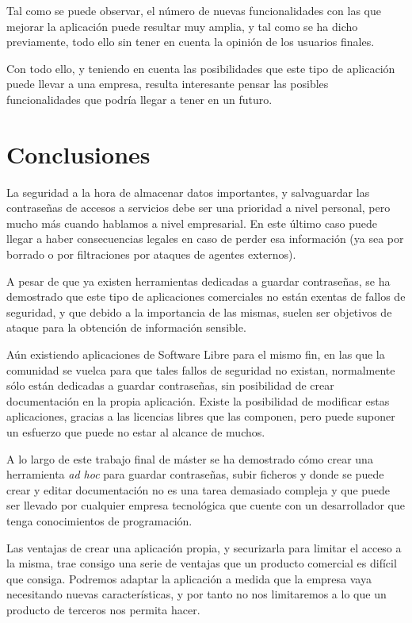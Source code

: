 \documentclass{\ClassPath/viu-tfm-template}
\begin{document}
Tal como se puede observar, el número de nuevas funcionalidades con las que mejorar la aplicación puede resultar muy amplia, y tal como se ha dicho previamente, todo ello sin tener en cuenta la opinión de los usuarios finales.

Con todo ello, y teniendo en cuenta las posibilidades que este tipo de aplicación puede llevar a una empresa, resulta interesante pensar las posibles funcionalidades que podría llegar a tener en un futuro.



\vfill
\pagebreak
\chapter{Conclusiones}

La seguridad a la hora de almacenar datos importantes, y salvaguardar las contraseñas de accesos a servicios debe ser una prioridad a nivel personal, pero mucho más cuando hablamos a nivel empresarial. En este último caso puede llegar a haber consecuencias legales en caso de perder esa información (ya sea por borrado o por filtraciones por ataques de agentes externos).

A pesar de que ya existen herramientas dedicadas a guardar contraseñas, se ha demostrado que este tipo de aplicaciones comerciales no están exentas de fallos de seguridad, y que debido a la importancia de las mismas, suelen ser objetivos de ataque para la obtención de información sensible.

Aún existiendo aplicaciones de Software Libre para el mismo fin, en las que la comunidad se vuelca para que tales fallos de seguridad no existan, normalmente sólo están dedicadas a guardar contraseñas, sin posibilidad de crear documentación en la propia aplicación. Existe la posibilidad de modificar estas aplicaciones, gracias a las licencias libres que las componen, pero puede suponer un esfuerzo que puede no estar al alcance de muchos.


A lo largo de este trabajo final de máster se ha demostrado cómo crear una herramienta \textit{ad hoc} para guardar contraseñas, subir ficheros y donde se puede crear y editar documentación no es una tarea demasiado compleja y que puede ser llevado por cualquier empresa tecnológica que cuente con un desarrollador que tenga conocimientos de programación.

Las ventajas de crear una aplicación propia, y securizarla para limitar el acceso a la misma, trae consigo una serie de ventajas que un producto comercial es difícil que consiga. Podremos adaptar la aplicación a medida que la empresa vaya necesitando nuevas características, y por tanto no nos limitaremos a lo que un producto de terceros nos permita hacer.
\end{document}
